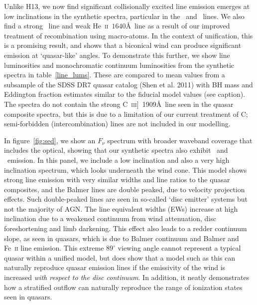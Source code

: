 \documentclass[useAMS,usenatbib]{mn2e_x}
\begin{document}
Unlike H13, we now find significant collisionally excited line emission emerges
at low inclinations in the synthetic spectra, particular in the \civ\ and \nv\
lines. We also find a strong \la\ line and weak He~\textsc{ii}~$1640$\AA\ line
as a result of our improved treatment of recombination using macro-atoms. 
In the context of unification, this is a promising result, 
and shows that a biconical wind can produce significant 
emission at `quasar-like' angles. To demonstrate this further,
we show line luminosities and monochromatic continuum luminosities
from the synthetic spectra in table~\ref{line_lums}. These are compared to
mean values from a subsample of the SDSS DR7 quasar catalog (Shen et al. 2011) 
with BH mass and Eddington fraction estimates similar to the fiducial model values 
(see caption). The spectra do not contain the strong 
C~\textsc{iii}]~1909\AA\ line seen in the quasar composite spectra, 
but this is due to a limitation of our current treatment of C; semi-forbidden
(intercombination) lines are not included in our modelling.

In figure~\ref{fig:sed}, we show an $F_{\nu}$ spectrum with broader waveband coverage
that includes the optical, showing that our synthetic spectra 
also exhibit \ha\ and \hb\ emission. 
In this panel, we include a low inclination and 
also a very high inclination 
spectrum, which looks underneath the wind cone. This model shows 
strong line emission with very similar widths and line ratios to the quasar composites, and
the Balmer lines are double peaked, due to velocity projection effects.  
Such double-peaked lines are seen in so-called `disc emitter' systems 
\citep[e.g.][]{eracleous1994} but not the majority of AGN.     
The line equivalent widths (EWs) increase at high inclination
due to a weakened continuum from wind attenuation, 
disc foreshortening and limb darkening. This effect also 
leads to a redder continuum slope, as seen in quasars, which is
due to Balmer continuum and Balmer and Fe~\textsc{ii} line emission.
This extreme $89^\circ$ viewing angle cannot represent a typical quasar within a unified model,
but does show that a model such as this can naturally reproduce quasar emission lines
if the emissivity of the wind is increased {\em with respect to the disc continuum}.
In addition, it neatly demonstrates how a stratified outflow can naturally
reproduce the range of ionization states seen in quasars.
\end{document}
